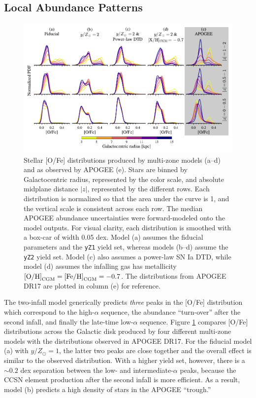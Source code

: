 \documentclass[twocolumn,twocolappendix,linenumbers]{aastex631}
\begin{document}
\subsection{Local Abundance Patterns}
\label{sec:abundance-distributions}

\begin{figure}
    \centering
    \includegraphics{src/tex/figures/ofe_df_comparison.pdf}
    \caption{Stellar [O/Fe] distributions produced by multi-zone models (a--d) and as observed by APOGEE (e). Stars are binned by Galactocentric radius, represented by the color scale, and absolute midplane distance $|z|$, represented by the different rows. Each distribution is normalized so that the area under the curve is 1, and the vertical scale is consistent across each row. The median APOGEE abundance uncertainties were forward-modeled onto the model outputs. For visual clarity, each distribution is smoothed with a box-car of width 0.05 dex. Model (a) assumes the fiducial parameters and the {\tt yZ1} yield set, whereas models (b--d) assume the {\tt yZ2} yield set. Model (c) also assumes a power-law SN Ia DTD, while model (d) assumes the infalling gas has metallicity ${\rm [O/H]}_{\rm CGM}={\rm [Fe/H]}_{\rm CGM}=-0.7$. The distributions from APOGEE DR17 are plotted in column (e) for reference.}
    \label{fig:ofe-df}
\end{figure}

The two-infall model generically predicts {\it three} peaks in the [O/Fe] distribution which correspond to the high-$\alpha$ sequence, the abundance ``turn-over'' after the second infall, and finally the late-time low-$\alpha$ sequence. Figure \ref{fig:ofe-df} compares [O/Fe] distributions across the Galactic disk produced by four different multi-zone models with the distributions observed in APOGEE DR17. For the fiducial model (a) with $y/Z_\odot=1$, the latter two peaks are close together and the overall effect is similar to the observed distribution. With a higher yield set, however, there is a $\sim0.2$ dex separation between the low- and intermediate-$\alpha$ peaks, because the CCSN element production after the second infall is more efficient. As a result, model (b) predicts a high density of stars in the APOGEE ``trough.''
\end{document}
